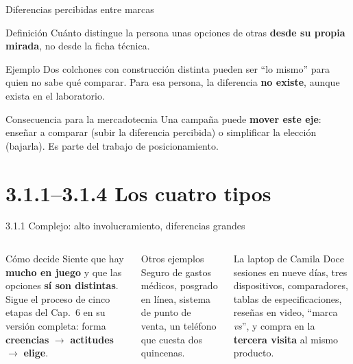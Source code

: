 \documentclass[aspectratio=169,xcolor=dvipsnames]{beamer}
\begin{document}
\begin{frame}{Diferencias percibidas entre marcas}
\begin{block}{Definición}
  \small Cuánto distingue la persona unas opciones de otras \textbf{desde su propia mirada}, no desde la ficha técnica.
\end{block}
\begin{exampleblock}{Ejemplo}
  \small Dos colchones con construcción distinta pueden ser \enquote{lo mismo} para quien no sabe qué comparar. Para esa persona, la diferencia \textbf{no existe}, aunque exista en el laboratorio.
\end{exampleblock}
\begin{alertblock}{Consecuencia para la mercadotecnia}
  \small Una campaña puede \textbf{mover este eje}: enseñar a comparar (subir la diferencia percibida) o simplificar la elección (bajarla). Es parte del trabajo de posicionamiento.
\end{alertblock}
\end{frame}

\begin{frame}{La matriz de los cuatro tipos}
\begin{center}
  }
\end{center}
\vspace{-2pt}
\fuente{elaboración propia con base en la tipología de Assael (1987).}
\end{frame}

\section[Cuatro tipos]{3.1.1--3.1.4 Los cuatro tipos}

\begin{frame}{3.1.1 Complejo: alto involucramiento, diferencias grandes}
\begin{columns}[T]
  \begin{block}{Cómo decide}
    \small Siente que hay \textbf{mucho en juego} y que las opciones \textbf{sí son distintas}. Sigue el proceso de cinco etapas del Cap.~6 en su versión completa: forma \textbf{creencias} $\to$ \textbf{actitudes} $\to$ \textbf{elige}.
  \end{block}
  \begin{block}{Otros ejemplos}
    \small Seguro de gastos médicos, posgrado en línea, sistema de punto de venta, un teléfono que cuesta dos quincenas.
  \end{block}
  \begin{exampleblock}{La laptop de Camila}
    \small Doce sesiones en nueve días, tres dispositivos, comparadores, tablas de especificaciones, reseñas en video, \enquote{marca \textit{vs}}, y compra en la \textbf{tercera visita} al mismo producto.
  \end{exampleblock}
\end{columns}
\end{frame}
\end{document}
